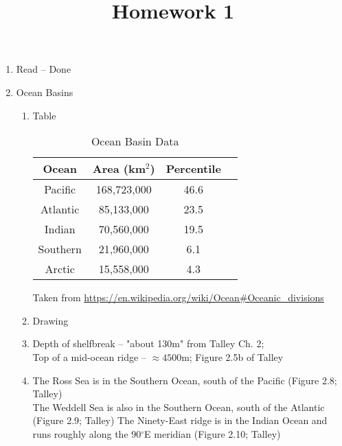 \documentclass[11pt,letterpaper]{article}
\begin{document}
\title{Homework 1}

\maketitle

\begin{enumerate}
\item Read -- Done

\item Ocean Basins

\begin{enumerate}

\item Table

\begin{table}[ht]
\caption{Ocean Basin Data}
\label{tab:dla}
\begin{center}
\begin{tabular}{cccc}
\hline
Ocean & Area (km$^2$) & Percentile \\
\hline
Pacific & 168,723,000 & 46.6 \\
Atlantic & 85,133,000 & 23.5 \\
Indian & 70,560,000 & 19.5 \\
Southern & 21,960,000 & 6.1 \\
Arctic & 15,558,000 & 4.3 \\
\hline
\end{tabular}
\end{center}
\end{table}
Taken from \url{https://en.wikipedia.org/wiki/Ocean#Oceanic_divisions}


\item Drawing

\item Depth of shelfbreak -- "about 130m" from Talley Ch. 2;  \\
Top of a mid-ocean ridge -- $\approx 4500$m;  Figure 2.5b of Talley

\item The Ross Sea is in the Southern Ocean, south of the Pacific (Figure 2.8; Talley) \\
The Weddell Sea is also in the Southern Ocean, south of the Atlantic (Figure 2.9; Talley)
The Ninety-East ridge is in the Indian Ocean and runs roughly along the 90$^\circ$E meridian
(Figure 2.10; Talley)


\end{enumerate}
\end{enumerate}

%
%
%


\end{document}
